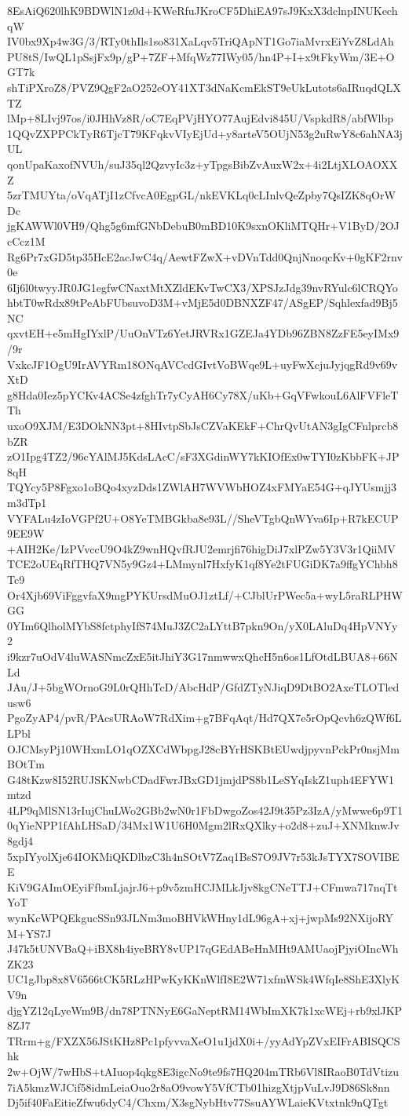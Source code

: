 8EsAiQ620lhK9BDWlN1z0d+KWeRfuJKroCF5DhiEA97sJ9KxX3dclnpINUKechqW
IV0bx9Xp4w3G/3/RTy0thIls1so831XaLqv5TriQApNT1Go7iaMvrxEiYvZ8LdAh
PU8tS/IwQL1pSsjFx9p/gP+7ZF+MfqWz77IWy05/hn4P+I+x9tFkyWm/3E+OGT7k
shTiPXroZ8/PVZ9QgF2aO252eOY41XT3dNaKcmEkST9eUkLutots6aIRuqdQLXTZ
lMp+8LIvj97os/i0JHhVz8R/oC7EqPVjHYO77AujEdvi845U/VspkdR8/abfWlbp
1QQvZXPPCkTyR6TjcT79KFqkvVIyEjUd+y8arteV5OUjN53g2uRwY8c6ahNA3jUL
qonUpaKaxofNVUh/suJ35ql2QzvyIc3z+yTpgsBibZvAuxW2x+4i2LtjXLOAOXXZ
5zrTMUYta/oVqATjI1zCfvcA0EgpGL/nkEVKLq0cLInlvQeZpby7QsIZK8qOrWDc
jgKAWWl0VH9/Qhg5g6mfGNbDebuB0mBD10K9sxnOKliMTQHr+V1ByD/2OJcCcz1M
Rg6Pr7xGD5tp35HcE2acJwC4q/AewtFZwX+vDVnTdd0QnjNnoqcKv+0gKF2rnv0e
6Ij6l0twyyJR0JG1egfwCNaxtMtXZldEKvTwCX3/XPSJzJdg39nvRYulc6lCRQYo
hbtT0wRdx89tPeAbFUbsuvoD3M+vMjE5d0DBNXZF47/ASgEP/Sqhlexfad9Bj5NC
qxvtEH+e5mHgIYxlP/UuOnVTz6YetJRVRx1GZEJa4YDb96ZBN8ZzFE5eyIMx9/9r
VxkcJF1OgU9IrAVYRm18ONqAVCcdGIvtVoBWqe9L+uyFwXcjuJyjqgRd9v69vXtD
g8Hda0Iez5pYCKv4ACSe4zfghTr7yCyAH6Cy78X/uKb+GqVFwkouL6AlFVFleTTh
uxoO9XJM/E3DOkNN3pt+8HIvtpSbJsCZVaKEkF+ChrQvUtAN3gIgCFnlprcb8bZR
zO1Ipg4TZ2/96cYAlMJ5KdsLAcC/sF3XGdinWY7kKIOfEx0wTYI0zKbbFK+JP8qH
TQYcy5P8Fgxo1oBQo4xyzDds1ZWlAH7WVWbHOZ4xFMYaE54G+qJYUsmjj3m3dTp1
VYFALu4zIoVGPf2U+O8YeTMBGkba8e93L//SheVTgbQnWYva6Ip+R7kECUP9EE9W
+AIH2Ke/IzPVvccU9O4kZ9wnHQvfRJU2emrjfi76higDiJ7xlPZw5Y3V3r1QiiMV
TCE2oUEqRfTHQ7VN5y9Gz4+LMmynl7HxfyK1qf8Ye2tFUGiDK7a9ffgYChbh8Tc9
Or4Xjb69ViFggvfaX9mgPYKUrsdMuOJ1ztLf/+CJblUrPWec5a+wyL5raRLPHWGG
0YIm6QlholMYbS8fctphyIfS74MuJ3ZC2aLYttB7pkn9On/yX0LAluDq4HpVNYy2
i9kzr7uOdV4luWASNmcZxE5itJhiY3G17nmwwxQhcH5n6os1LfOtdLBUA8+66NLd
JAu/J+5bgWOrnoG9L0rQHhTcD/AbcHdP/GfdZTyNJiqD9DtBO2AxeTLOTledusw6
PgoZyAP4/pvR/PAcsURAoW7RdXim+g7BFqAqt/Hd7QX7e5rOpQcvh6zQWf6LLPbl
OJCMsyPj10WHxmLO1qOZXCdWbpgJ28cBYrHSKBtEUwdjpyvnPckPr0nsjMmBOtTm
G48tKzw8I52RUJSKNwbCDadFwrJBxGD1jmjdPS8b1LeSYqIskZ1uph4EFYW1mtzd
4LP9qMlSN13rIujChuLWo2GBb2wN0r1FbDwgoZos42J9t35Pz3IzA/yMwwe6p9T1
0qYieNPP1fAhLHSaD/34Mx1W1U6H0Mgm2lRxQXlky+o2d8+zuJ+XNMknwJv8gdj4
5xpIYyolXje64IOKMiQKDlbzC3h4nSOtV7Zaq1BsS7O9JV7r53kJsTYX7SOVIBEE
KiV9GAImOEyiFfbmLjajrJ6+p9v5zmHCJMLkJjv8kgCNeTTJ+CFmwa717nqTtYoT
wynKcWPQEkgucSSn93JLNm3moBHVkWHny1dL96gA+xj+jwpMs92NXijoRYM+YS7J
J47k5tUNVBaQ+iBX8h4iyeBRY8vUP17qGEdABeHnMHt9AMUaojPjyiOIncWhZK23
UC1gJbp8x8V6566tCK5RLzHPwKyKKnWlfI8E2W71xfmWSk4WfqIe8ShE3XlyKV9n
djgYZ12qLyeWm9B/dn78PTNNyE6GaNeptRM14WbImXK7k1xcWEj+rb9xlJKP8ZJ7
TRrm+g/FXZX56JStKHz8Pc1pfyvvaXeO1u1jdX0i+/yyAdYpZVxEIFrABISQCShk
2w+OjW/7wHbS+tAIuop4qkg8E3igcNo9te9fs7HQ204mTRb6Vl8IRaoB0TdVtizu
7iA5kmzWJCif58idmLeiaOuo2r8aO9vowY5VfCTb01hizgXtjpVuLvJ9D86Sk8nn
Dj5if40FaEitieZfwu6dyC4/Chxm/X3sgNybHtv77SsuAYWLaieKVtxtnk9nQTgt
